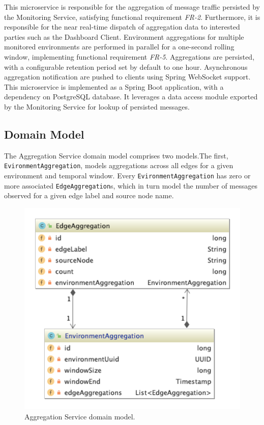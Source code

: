 This microservice is responsible for the aggregation of message traffic persisted by the Monitoring Service, satisfying functional requirement \textit{FR-2}. Furthermore, it is responsible for the near real-time dispatch of aggregation data to interested parties such as the Dashboard Client. Environment aggregations for multiple monitored environments are performed in parallel for a one-second rolling window, implementing functional requirement \textit{FR-5}. Aggregations are persisted, with a configurable retention period set by default to one hour. Asynchronous aggregation notification are pushed to clients using Spring WebSocket support. This microservice is implemented as a Spring Boot application, with a dependency on PostgreSQL database. It leverages a data access module exported by the Monitoring Service for lookup of persisted messages.


\subsection{Domain Model} \label{aggregation_service_domain_model}
The Aggregation Service domain model comprises two models.The first, \texttt{EvironmentAggregation}, models aggregations across all edges for a given environment and temporal window. Every \texttt{EvironmentAggregation} has zero or more associated  \texttt{EdgeAggregation}s, which in turn model the number of messages observed for a given edge label and source node name.

 \begin{figure}[H]
	\centering  
	\includegraphics[scale=3.0] {figures/impl/aggregation/domain_package.png}
	\caption{Aggregation Service domain model.}
	\label{aggregation_svc_domain_model}
\end{figure}

